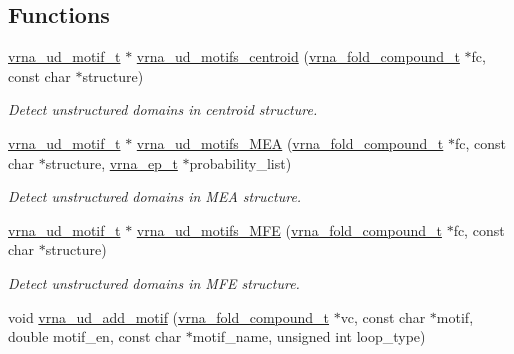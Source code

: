 \subsection*{Functions}
\begin{DoxyCompactItemize}
\item 
\mbox{\hyperlink{structvrna__unstructured__domain__motif__s}{vrna\+\_\+ud\+\_\+motif\+\_\+t}} $\ast$ \mbox{\hyperlink{group__domains__up_ga2039caedf194c5edec794866986d95ec}{vrna\+\_\+ud\+\_\+motifs\+\_\+centroid}} (\mbox{\hyperlink{group__fold__compound_ga1b0cef17fd40466cef5968eaeeff6166}{vrna\+\_\+fold\+\_\+compound\+\_\+t}} $\ast$fc, const char $\ast$structure)
\begin{DoxyCompactList}\small\item\em Detect unstructured domains in centroid structure. \end{DoxyCompactList}\item 
\mbox{\hyperlink{structvrna__unstructured__domain__motif__s}{vrna\+\_\+ud\+\_\+motif\+\_\+t}} $\ast$ \mbox{\hyperlink{group__domains__up_ga980126e9f350b64474b35f20fce2782c}{vrna\+\_\+ud\+\_\+motifs\+\_\+\+M\+EA}} (\mbox{\hyperlink{group__fold__compound_ga1b0cef17fd40466cef5968eaeeff6166}{vrna\+\_\+fold\+\_\+compound\+\_\+t}} $\ast$fc, const char $\ast$structure, \mbox{\hyperlink{group__struct__utils__plist_gab9ac98ab55ded9fb90043b024b915aca}{vrna\+\_\+ep\+\_\+t}} $\ast$probability\+\_\+list)
\begin{DoxyCompactList}\small\item\em Detect unstructured domains in M\+EA structure. \end{DoxyCompactList}\item 
\mbox{\hyperlink{structvrna__unstructured__domain__motif__s}{vrna\+\_\+ud\+\_\+motif\+\_\+t}} $\ast$ \mbox{\hyperlink{group__domains__up_ga464d086264dd6f45089a65acec4e8c21}{vrna\+\_\+ud\+\_\+motifs\+\_\+\+M\+FE}} (\mbox{\hyperlink{group__fold__compound_ga1b0cef17fd40466cef5968eaeeff6166}{vrna\+\_\+fold\+\_\+compound\+\_\+t}} $\ast$fc, const char $\ast$structure)
\begin{DoxyCompactList}\small\item\em Detect unstructured domains in M\+FE structure. \end{DoxyCompactList}\item 
void \mbox{\hyperlink{group__domains__up_ga55f7de5ef5b7472b0eeab9296b57f671}{vrna\+\_\+ud\+\_\+add\+\_\+motif}} (\mbox{\hyperlink{group__fold__compound_ga1b0cef17fd40466cef5968eaeeff6166}{vrna\+\_\+fold\+\_\+compound\+\_\+t}} $\ast$vc, const char $\ast$motif, double motif\+\_\+en, const char $\ast$motif\+\_\+name, unsigned int loop\+\_\+type)

\end{DoxyCompactItemize}
